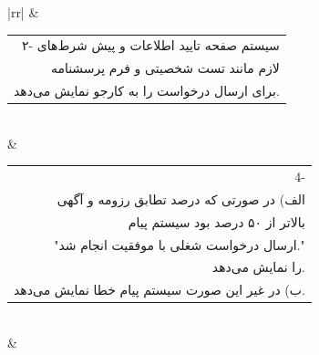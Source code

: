 \documentclass[12pt]{article}
\begin{document}
\begin{center}
\begin{table}[H]
\begin{tabular}{|rr|}
			                                           & \begin{tabular}[c]{@{}r@{}}۲- سیستم صفحه تایید اطلاعات و پیش شرط‌های\\  لازم مانند تست شخصیتی و فرم پرسشنامه\\  برای ارسال درخواست را به کارجو نمایش می‌دهد.\end{tabular}                                                                     \\ \hline
			 & \begin{tabular}[c]{@{}r@{}}4- \\ الف) در صورتی که درصد تطابق رزومه و آگهی\\  بالاتر از ۵۰ درصد بود سیستم پیام \\ "ارسال درخواست شغلی با موفقیت انجام شد." \\  را نمایش می‌دهد.\\ ب) در غیر این صورت سیستم پیام خطا نمایش می‌دهد.\end{tabular} \\ \hline
			                            &                                                                                                                                                                                                                          \\ \hline

		\end{tabular}
	\end{table}


\end{center}
\end{document}
